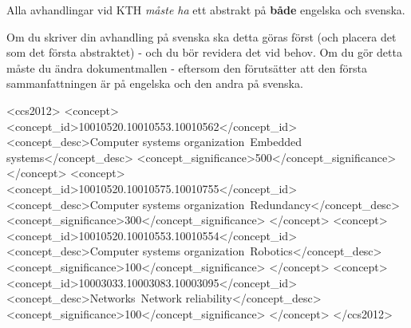 \documentclass[manuscript, screen]{timtm}
\newenvironment{swedishabstract}{}{}
\newcommand{\SwedishKeywords}[1]{}
\begin{document}
\begin{swedishabstract}
\begin{scontents}[store-env=abstracts,print-env=false]
Alla avhandlingar vid KTH \textit{måste ha} ett abstrakt på \textbf{både} engelska och svenska.

Om du skriver din avhandling på svenska ska detta göras först (och placera det som det första abstraktet) - och du bör revidera det vid behov. Om du gör detta måste du ändra dokumentmallen - eftersom den förutsätter att den första sammanfattningen är på engelska och den andra på svenska.
\end{scontents}
\end{swedishabstract}

\begin{CCSXML}
<ccs2012>
 <concept>
  <concept_id>10010520.10010553.10010562</concept_id>
  <concept_desc>Computer systems organization~Embedded systems</concept_desc>
  <concept_significance>500</concept_significance>
 </concept>
 <concept>
  <concept_id>10010520.10010575.10010755</concept_id>
  <concept_desc>Computer systems organization~Redundancy</concept_desc>
  <concept_significance>300</concept_significance>
 </concept>
 <concept>
  <concept_id>10010520.10010553.10010554</concept_id>
  <concept_desc>Computer systems organization~Robotics</concept_desc>
  <concept_significance>100</concept_significance>
 </concept>
 <concept>
  <concept_id>10003033.10003083.10003095</concept_id>
  <concept_desc>Networks~Network reliability</concept_desc>
  <concept_significance>100</concept_significance>
 </concept>
</ccs2012>
\end{CCSXML}


\SwedishKeywords{datauppsättningar, neurala nätverk, blickdetektering, texttaggning}


\kthcover
\titlepage
\end{document}
